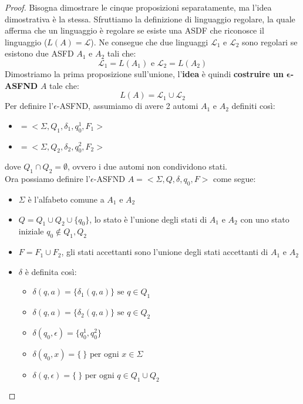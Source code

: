\begin{proof}
    Bisogna dimostrare le cinque proposizioni separatamente, ma l'idea dimostrativa è la stessa.
    Sfruttiamo la definizione di linguaggio regolare, la quale afferma che un linguaggio è regolare se esiste una ASDF
    che riconosce il linguaggio ($L(A) = \mathcal{L}$). Ne consegue che due linguaggi $\mathcal{L}_1$ e $\mathcal{L}_2$ sono regolari se esistono due ASFD $A_1$ e $A_2$ tali che:
    \[ \mathcal{L}_1  = L(A_1) \text{  e  } \mathcal{L}_2  = L(A_2)\]
    Dimostriamo la prima proposizione sull'unione, l'\textbf{idea} è quindi \textbf{costruire un} $\bm{\epsilon}$\textbf{-ASFND} $A$ tale che:
    \[  L(A) = \mathcal{L}_1  \cup \mathcal{L}_2      \] 
    Per definire l'$\epsilon$-ASFND, assumiamo di avere 2 automi $A_1$ e $A_2$ definiti così:
    \begin{itemize}
        \item [$\bm{A_1}$]\(= < \Sigma,Q_1,\delta_1,q_0^1,F_1 > \)
        \item[$\bm{A_2}$] \(=< \Sigma,Q_2,\delta_2,q_0^2,F_2 > \)
    \end{itemize}
    dove $Q_1 \cap Q_2 = \emptyset$, ovvero i due automi non condividono stati.\\ Ora possiamo definire l'$\epsilon$-ASFND
    $A = < \Sigma, Q,\delta,q_0,F>$ come segue:
    \begin{itemize}
        \item $\Sigma$ è l'alfabeto comune a $A_1$ e $A_2$
        \item $Q = Q_1 \cup Q_2 \cup \{ q_0 \}$, lo stato è l'unione degli stati di $A_1$ e $A_2$ con uno stato iniziale $q_0 \notin Q_1,Q_2$
        \item $F = F_1 \cup F_2$, gli stati accettanti sono l'unione degli stati accettanti di $A_1$ e $A_2$
        \item $\delta$ è definita così:\\
        \begin{minipage}{0.45\textwidth}
            \begin{itemize}
            \item $\delta (q,a) = \{ \delta_1(q,a) \} \text{ se } q \in Q_1$
            \item $\delta (q,a) = \{ \delta_2(q,a) \} \text{ se } q \in Q_2$
            \item $\delta(q_0,\epsilon) = \{ q_0^1, q_0^2  \}$
            \item $\delta (q_0, x) = \{ \ \} \text{ per ogni } x \in \Sigma$ 
            \item $\delta (q, \epsilon) = \{ \ \} \text{ per ogni } q \in Q_1 \cup Q_2$   

\end{itemize}
\end{minipage}
\end{itemize}
\end{proof}
